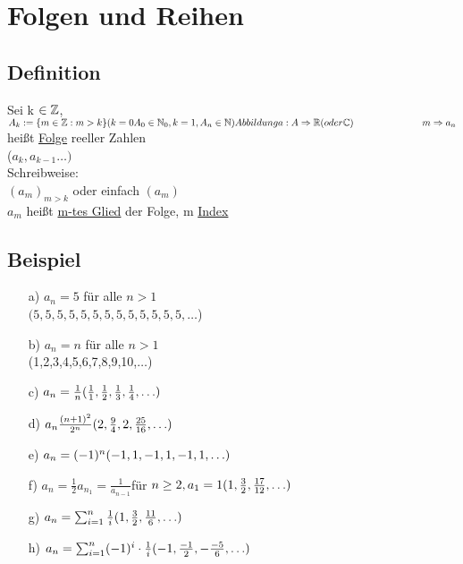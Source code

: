 \section{Folgen und Reihen}
\subsection{Definition}
Sei k $\in \mathbb{Z}$,
$A_k := \{ m \in \mathbb{Z} : m > k\}\\
(k = 0 A_0 \in \mathbb{N}_0, k = 1 , A_n \in \mathbb{N})\\
Abbildung a : A \Rightarrow \mathbb{R} (oder \mathbb{C})\\
\hspace*{2.5cm} m \Rightarrow a_n\\
$hei\ss t \underline{Folge} reeller Zahlen\\
\hspace*{2.5cm} ($a_k,a_{k-1} \ldots)$\\
Schreibweise:\\
$(a_m)_{m>k}$ oder einfach $(a_m)$\\
$a_m$ hei\ss t \underline{m-tes Glied} der Folge, m \underline{Index}\\
\subsection{Beispiel}
\begin{enumerate}
\item[a)] $a_n = 5$ f\"ur alle $n > 1$\\
$(5,5,5,5,5,5,5,5,5,5,5,5,5,\ldots$)\\
\item[b)] $a_n = n$ f\"ur alle $n>1$\\
 (1,2,3,4,5,6,7,8,9,10,$\ldots$)\\
\item[c)] $a_n = \frac{1}{n}\\
(\frac{1}{1}, \frac{1}{2} ,\frac{1}{3}, \frac{1}{4}, \ldots)$\\
\item[d)]$a_n \frac{(n+1)^2}{2^n}\\
(2, \frac{9}{4},2,\frac{25}{16}, \ldots)$\\
\item[e)]$a_n = (-1)^n\\
(-1,1,-1,1,-1,1,\ldots)\\ $
\item[f)]$a_n = \frac{1}{2}a_{n_1} = \frac{1}{a_{n-1}} $f\"ur $n\geq 2,
a_1 =1\\
(1,\frac{3}{2},\frac{17}{12}, \ldots)$
\item[g)]$a_n = \sum_{i=1}^{n} \frac{1}{i}\\
(1,\frac{3}{2}, \frac{11}{6},\ldots)$
\item[h)]$a_n = \sum_{i=1}^{n} (-1)^i\cdot \frac{1}{i}\\
(-1,\frac{-1}{2},-\frac{-5}{6},\ldots)$
\end{enumerate}
